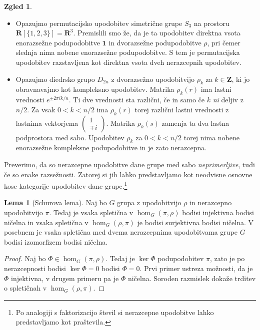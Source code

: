 \documentclass[11pt]{book}
\def\ZZ{\mathbf{Z}}
\def\RR{\mathbf{R}}
\def\11{\mathbf{1}}
\theoremstyle{definition}
\theoremstyle{zgled}
\newtheorem*{zgled}{Zgled}
\theoremstyle{odprtproblem}
\theoremstyle{domacanaloga}
\newenvironment{dokaz}
    {\color{siva}\begin{proof}}
    {\end{proof}}
\theoremstyle{izrek}
\newtheorem*{lema}{Lema}
\begin{document}
\begin{zgled} \leavevmode
\begin{itemize}
\item Opazujmo permutacijsko upodobitev simetrične grupe $S_3$ na prostoru $\RR[\{ 1,2,3 \}] = \RR^3$. Premislili smo že, da je ta upodobitev direktna vsota enorazsežne podupodobitve $\11$ in dvorazsežne podupodobitve $\rho$, pri čemer slednja nima nobene enorazsežne podupodobitve. S tem je permutacijska upodobitev razstavljena kot direktna vsota dveh nerazcepnih upodobitev.

\item Opazujmo diedrsko grupo $D_{2n}$ z dvorazsežno upodobitvijo $\rho_k$ za $k \in \ZZ$, ki jo obravnavajmo kot kompleksno upodobitev. Matrika $\rho_k(r)$ ima lastni vrednosti $e^{\pm 2 \pi i k / n}$. Ti dve vrednosti sta različni, če in samo če $k$ \emph{ni} deljiv z $n/2$. Za vsak $0 < k < n/2$ ima $\rho_k(r)$ torej različni lastni vrednosti z lastnima vektorjema $\left( \begin{smallmatrix} 1 \\ \mp i \end{smallmatrix} \right)$. Matrika $\rho_k(s)$ zamenja ta dva lastna podprostora med sabo. Upodobitev $\rho_k$ za $0 < k < n/2$ torej nima nobene enorazsežne kompleksne podupodobitve in je zato nerazcepna.
\end{itemize}
\end{zgled}

Preverimo, da so nerazcepne upodobitve dane grupe med sabo \emph{neprimerljive}, tudi če so enake razsežnosti. Zatorej si jih lahko predstavljamo kot neodvisne osnovne kose kategorije upodobitev dane grupe.\footnote{Po analogiji s faktorizacijo števil si nerazcepne upodobitve lahko predstavljamo kot praštevila.} 

\begin{lema}[Schurova lema]
Naj bo $G$ grupa z upodobitvijo $\rho$ in nerazcepno upodobitvijo $\pi$. Tedaj je vsaka spletična v $\hom_G(\pi, \rho)$ bodisi injektivna bodisi ničelna in vsaka spletična v $\hom_G(\rho, \pi)$ je bodisi surjektivna bodisi ničelna. V posebnem je vsaka spletična med dvema nerazcepnima upodobitvama grupe $G$ bodisi izomorfizem bodisi ničelna.
\end{lema}
\begin{dokaz}
Naj bo $\Phi \in \hom_G(\pi, \rho)$. Tedaj je $\ker \Phi$ podupodobitev $\pi$, zato je po nerazcepnosti bodisi $\ker \Phi = 0$ bodisi $\Phi = 0$. Prvi primer ustreza možnosti, da je $\Phi$ injektivna, v drugem primeru pa je $\Phi$ ničelna. Soroden razmislek dokaže trditev o spletičnah v $\hom_G(\rho, \pi)$. 
\end{dokaz}
\end{document}
